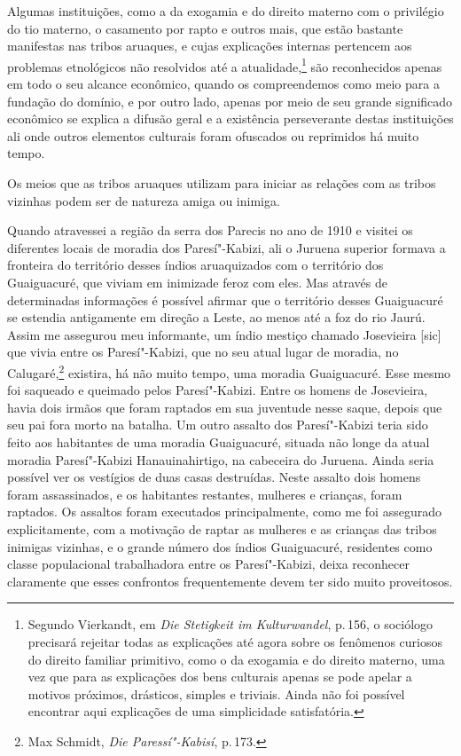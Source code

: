 Algumas instituições, como a da exogamia e do direito materno com o
privilégio do tio materno, o casamento por rapto e outros mais, que
estão bastante manifestas nas tribos aruaques, e cujas explicações
internas pertencem aos problemas etnológicos não resolvidos até a
atualidade,\footnote{Segundo Vierkandt, em \textit{Die Stetigkeit im
  Kulturwandel}, p.\,156, o sociólogo precisará rejeitar todas as
  explicações até agora sobre os fenômenos curiosos do direito familiar
  primitivo, como o da exogamia e do direito materno, uma vez que para
  as explicações dos bens culturais apenas se pode apelar a motivos
  próximos, drásticos, simples e triviais. Ainda não foi possível
  encontrar aqui explicações de uma simplicidade satisfatória.} são
reconhecidos apenas em todo o seu alcance econômico, quando os
compreendemos como meio para a fundação do domínio, e por outro lado,
apenas por meio de seu grande significado econômico se explica a difusão
geral e a existência perseverante destas instituições ali onde outros
elementos culturais foram ofuscados ou reprimidos há muito tempo.

Os meios que as tribos aruaques utilizam para iniciar as relações com as
tribos vizinhas podem ser de natureza amiga ou inimiga.

Quando atravessei a região da serra dos Parecis no ano de 1910 e visitei
os diferentes locais de moradia dos Paresí"-Kabizi, ali o Juruena
superior formava a fronteira do território desses índios aruaquizados
com o território dos Guaiguacuré, que viviam em inimizade feroz com
eles. Mas através de determinadas informações é possível afirmar que o
território desses Guaiguacuré se estendia antigamente em direção a
Leste, ao menos até a foz do rio Jaurú. Assim me assegurou meu
informante, um índio mestiço chamado Josevieira {[}sic{]} que vivia
entre os Paresí"-Kabizi, que no seu atual lugar de moradia, no
Calugaré,\footnote{Max Schmidt, \textit{Die Paressí"-Kabisí}, p.\,173.}
existira, há não muito tempo, uma moradia Guaiguacuré. Esse mesmo foi
saqueado e queimado pelos Paresí"-Kabizi. Entre os homens de Josevieira,
havia dois irmãos que foram raptados em sua juventude nesse saque,
depois que seu pai fora morto na batalha. Um outro assalto dos
Paresí"-Kabizi teria sido feito aos habitantes de uma moradia
Guaiguacuré, situada não longe da atual moradia Paresí"-Kabizi
Hanauinahirtigo, na cabeceira do Juruena. Ainda seria possível ver os
vestígios de duas casas destruídas. Neste assalto dois homens foram
assassinados, e os habitantes restantes, mulheres e crianças, foram
raptados. Os assaltos foram executados principalmente, como me foi
assegurado explicitamente, com a motivação de raptar as mulheres e as
crianças das tribos inimigas vizinhas, e o grande número dos índios
Guaiguacuré, residentes como classe populacional trabalhadora entre os
Paresí"-Kabizi, deixa reconhecer claramente que esses confrontos
frequentemente devem ter sido muito proveitosos. 

